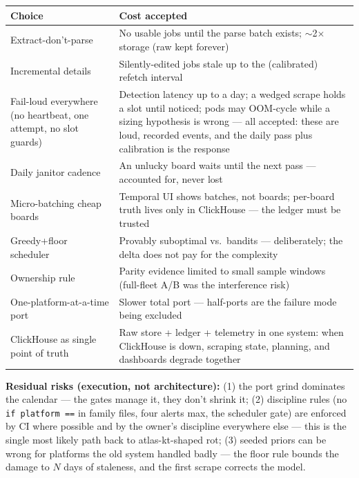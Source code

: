 \documentclass[11pt,a4paper]{article}
\begin{document}
\begin{center}
\begin{tabularx}{\textwidth}{@{}lX@{}}
\toprule
Choice & Cost accepted \\
\midrule
Extract-don't-parse & No usable jobs until the parse batch exists; $\sim$2$\times$ storage (raw kept
forever) \\
Incremental details & Silently-edited jobs stale up to the (calibrated) refetch interval \\
Fail-loud everywhere (no heartbeat, one attempt, no slot guards) & Detection latency up to a day; a wedged
scrape holds a slot until noticed; pods may OOM-cycle while a sizing hypothesis is wrong --- all accepted:
these are loud, recorded events, and the daily pass plus calibration is the response \\
Daily janitor cadence & An unlucky board waits until the next pass --- accounted for, never lost \\
Micro-batching cheap boards & Temporal UI shows batches, not boards; per-board truth lives only in
ClickHouse --- the ledger must be trusted \\
Greedy+floor scheduler & Provably suboptimal vs.\ bandits --- deliberately; the delta does not pay for the
complexity \\
Ownership rule & Parity evidence limited to small sample windows (full-fleet A/B was the interference
risk) \\
One-platform-at-a-time port & Slower total port --- half-ports are the failure mode being excluded \\
ClickHouse as single point of truth & Raw store + ledger + telemetry in one system: when ClickHouse is
down, scraping state, planning, and dashboards degrade together \\
\bottomrule
\end{tabularx}
\end{center}

\textbf{Residual risks (execution, not architecture):} (1) the port grind dominates the calendar --- the
gates manage it, they don't shrink it; (2) discipline rules (no \texttt{if platform ==} in family files,
four alerts max, the scheduler gate) are enforced by CI where possible and by the owner's discipline
everywhere else --- this is the single most likely path back to atlas-kt-shaped rot; (3) seeded priors can
be wrong for platforms the old system handled badly --- the floor rule bounds the damage to $N$ days of
staleness, and the first scrape corrects the model.
\end{document}
